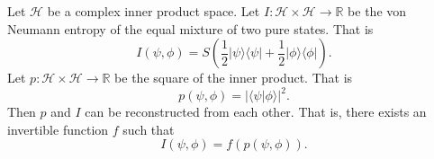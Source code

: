 \documentclass[10pt,twocolumn, nofootinbib]{revtex4-2}
\def\>{\rangle}
\def\<{\langle}
\begin{document}
\begin{prop}\label{prop_innerProductIsEntropy}
Let $\mathcal{H}$ be a complex inner product space. Let $I : \mathcal{H} \times \mathcal{H} \to \mathbb{R}$ be the von Neumann entropy of the equal mixture of two pure states. That is
\begin{equation}
I(\psi, \phi) = S\left(\frac{1}{2}|\psi\>\<\psi| + \frac{1}{2}|\phi\>\<\phi|\right).
\end{equation}
Let $p : \mathcal{H} \times \mathcal{H} \to \mathbb{R}$ be the square of the inner product. That is
\begin{equation}
p(\psi, \phi) = |\<\psi| \phi\>|^2.
\end{equation}
Then $p$ and $I$ can be reconstructed from each other. That is, there exists an invertible function $f$ such that
\begin{equation}
I(\psi, \phi) = f(p(\psi, \phi)).
\end{equation}
\end{prop}
\end{document}
